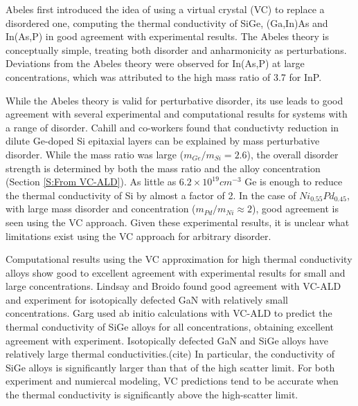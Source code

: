 \documentclass[aps,prb,onecolumn,preprint,superscriptaddress,amsmath,amssymb,floatfix]{revtex4}
\begin{document}
Abeles first introduced the idea of using a virtual crystal (VC) to 
replace a disordered one, computing the
thermal conductivity of SiGe, (Ga,In)As and In(As,P) in good agreement 
with experimental results. The Abeles theory is conceptually simple,  
treating both
disorder and anharmonicity as perturbations.\cite{abeles_lattice_1963} 
Deviations from the Abeles theory 
were observed for In(As,P) at large concentrations, which was attributed 
to the high mass ratio of 3.7 for InP.
\cite{abeles_lattice_1963}

While the Abeles theory is valid for 
perturbative disorder, its use leads to good agreement with
several experimental and computational results for systems with 
a range of disorder. 
Cahill and co-workers found that conductivty reduction in dilute 
Ge-doped Si epitaxial layers 
can be explained by mass perturbative disorder.
\cite{cahill_thermal_2004,cahill_thermal_2005} 
While the mass ratio was large ($m_{Ge}/m_{Si} = 2.6$),  
the overall disorder strength is determined by both the mass ratio and 
the alloy concentration (Section \ref{S:From VC-ALD}). 
As little as $6.2\times10^{19} cm^{-3}$ Ge  
is enough to reduce the thermal conductivity of 
Si by almost a factor of 2.\cite{cahill_thermal_2004}
In the
case of $Ni_{0.55}Pd_{0.45}$, with large mass disorder and 
concentration ($m_{Pd}/m_{Ni} \approx 2$), 
good agreement is seen using the VC approach.
\cite{kamitakahara_vibrations_1974} 
Given these experimental results, it is unclear what limitations exist 
using the VC approach for arbitrary disorder.

Computational results using the VC approximation 
for high thermal conductivity 
alloys show good to excellent agreement with experimental results for 
small and large concentrations.
\cite{garg_role_2011,lindsay_thermal_2012} 
Lindsay and Broido 
found good agreement with VC-ALD and experiment for 
isotopically defected GaN with relatively small concentrations.
\cite{lindsay_thermal_2012}  
Garg used ab initio calculations with VC-ALD   
to predict the thermal conductivity of SiGe alloys 
for all concentrations, obtaining excellent agreement with experiment.
\cite{garg_role_2011}  
Isotopically defected GaN and SiGe alloys have relatively large 
thermal conductivities.(cite) In 
particular, the conductivity of SiGe alloys is significantly 
larger than that of the high scatter limit.\cite{cahill_lattice_1988}  
For both experiment and numiercal modeling, VC predictions tend 
to be accurate when the thermal conductivity is significantly above 
the high-scatter limit.
\cite{abeles_lattice_1963,kamitakahara_vibrations_1974,
cahill_thermal_2004,cahill_thermal_2005,
cahill_lattice_1988,garg_role_2011,lindsay_thermal_2012} 
\end{document}
